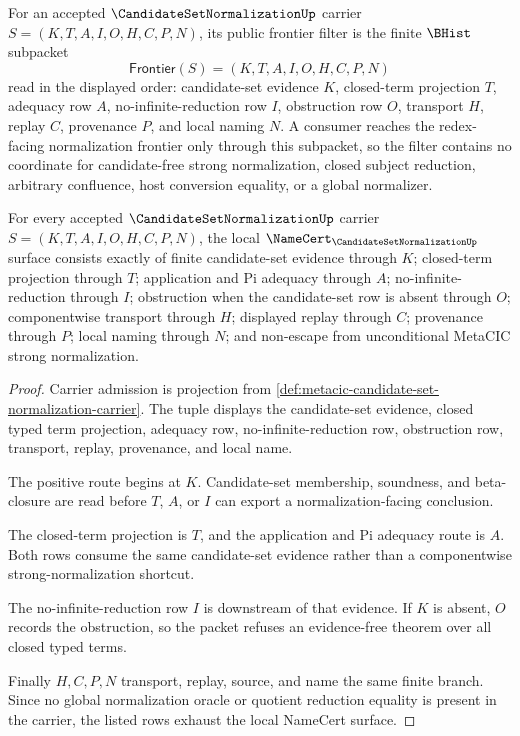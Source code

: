 \begin{definition}
\label{def:candidate-set-normalization-frontier-filter}
For an accepted $\CandidateSetNormalizationUp$ carrier $S=(K,T,A,I,O,H,C,P,N)$, its public frontier filter is the finite $\BHist$ subpacket
$$
\mathsf{Frontier}(S)=(K,T,A,I,O,H,C,P,N)
$$
read in the displayed order: candidate-set evidence $K$, closed-term projection $T$, adequacy row $A$, no-infinite-reduction row $I$, obstruction row $O$, transport $H$, replay $C$, provenance $P$, and local naming $N$. A consumer reaches the redex-facing normalization frontier only through this subpacket, so the filter contains no coordinate for candidate-free strong normalization, closed subject reduction, arbitrary confluence, host conversion equality, or a global normalizer.
\end{definition}

\begin{theorem}
\label{thm:metacic-candidate-set-normalization-obligations}
For every accepted $\CandidateSetNormalizationUp$ carrier $S=(K,T,A,I,O,H,C,P,N)$, the local $\NameCert_{\CandidateSetNormalizationUp}$ surface consists exactly of finite candidate-set evidence through $K$; closed-term projection through $T$; application and Pi adequacy through $A$; no-infinite-reduction through $I$; obstruction when the candidate-set row is absent through $O$; componentwise transport through $H$; displayed replay through $C$; provenance through $P$; local naming through $N$; and non-escape from unconditional MetaCIC strong normalization.
\end{theorem}
\begin{proof}
Carrier admission is projection from \autoref{def:metacic-candidate-set-normalization-carrier}. The tuple displays the candidate-set evidence, closed typed term projection, adequacy row, no-infinite-reduction row, obstruction row, transport, replay, provenance, and local name.

The positive route begins at $K$. Candidate-set membership, soundness, and beta-closure are read before $T$, $A$, or $I$ can export a normalization-facing conclusion.

The closed-term projection is $T$, and the application and Pi adequacy route is $A$. Both rows consume the same candidate-set evidence rather than a componentwise strong-normalization shortcut.

The no-infinite-reduction row $I$ is downstream of that evidence. If $K$ is absent, $O$ records the obstruction, so the packet refuses an evidence-free theorem over all closed typed terms.

Finally $H,C,P,N$ transport, replay, source, and name the same finite branch. Since no global normalization oracle or quotient reduction equality is present in the carrier, the listed rows exhaust the local NameCert surface.
\end{proof}

